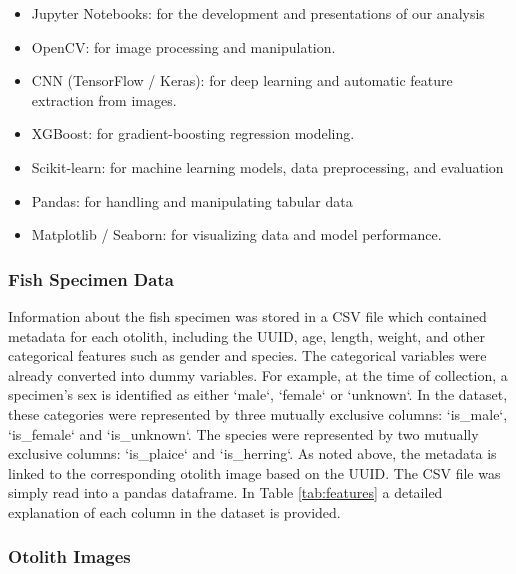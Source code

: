 \begin{itemize}
    \item Jupyter Notebooks: for the development and presentations of our analysis
    \item OpenCV: for image processing and manipulation.
    \item CNN (TensorFlow / Keras): for deep learning and automatic feature extraction from images.
    \item XGBoost: for gradient-boosting regression modeling.
    \item Scikit-learn: for machine learning models, data preprocessing, and evaluation
    \item Pandas: for handling and manipulating tabular data
    \item Matplotlib / Seaborn: for visualizing data and model performance.
\end{itemize}

\subsubsection{Fish Specimen Data}

Information about the fish specimen was stored in a CSV file which contained metadata for each otolith, including the UUID, age, length, weight, and other categorical features such as gender and species.
The categorical variables were already converted into dummy variables.
For example, at the time of collection, a specimen's sex is identified as either `male`, `female` or `unknown`.
In the dataset, these categories were represented by three mutually exclusive columns: `is\_male`, `is\_female` and `is\_unknown`.
The species were represented by two mutually exclusive columns: `is\_plaice` and `is\_herring`.
As noted above, the metadata is linked to the corresponding otolith image based on the UUID\@.
The CSV file was simply read into a pandas dataframe.
In Table \ref{tab:features} a detailed explanation of each column in the dataset is provided.

\subsubsection{Otolith Images}

